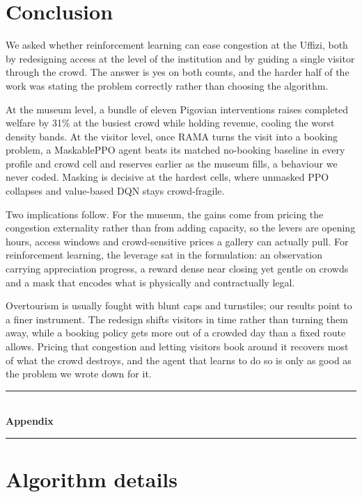\documentclass[11pt]{article}
\numberwithin{equation}{section} %
\begin{document}
\section{Conclusion}

We asked whether reinforcement learning can ease congestion at the Uffizi, both by redesigning access at the
level of the institution and by guiding a single visitor through the crowd. The answer is yes on both counts,
and the harder half of the work was stating the problem correctly rather than choosing the algorithm.

At the museum level, a bundle of eleven Pigovian interventions raises completed welfare by 31\% at the busiest
crowd while holding revenue, cooling the worst density bands. At the visitor level, once RAMA turns the visit
into a booking problem, a MaskablePPO agent beats its matched no-booking baseline in every profile and crowd
cell and reserves earlier as the museum fills, a behaviour we never coded. Masking is decisive at the hardest
cells, where unmasked PPO collapses and value-based DQN stays crowd-fragile.

Two implications follow. For the museum, the gains come from pricing the congestion externality rather than
from adding capacity, so the levers are opening hours, access windows and crowd-sensitive prices a gallery can
actually pull. For reinforcement learning, the leverage sat in the formulation: an observation carrying
appreciation progress, a reward dense near closing yet gentle on crowds and a mask that encodes what is
physically and contractually legal.

Overtourism is usually fought with blunt caps and turnstiles; our results point to a finer instrument. The
redesign shifts visitors in time rather than turning them away, while a booking policy gets more out of a
crowded day than a fixed route allows. Pricing that congestion and letting visitors book around it recovers
most of what the crowd destroys, and the agent that learns to do so is only as good as the problem we wrote
down for it.

\clearpage
\appendix
\begin{center}
\rule{\linewidth}{0.4pt}\\[0.4em]
{\LARGE\bfseries Appendix}\\[0.2em]
\rule{\linewidth}{0.4pt}
\end{center}

\section{Algorithm details}
\label{app:algos}
\end{document}
